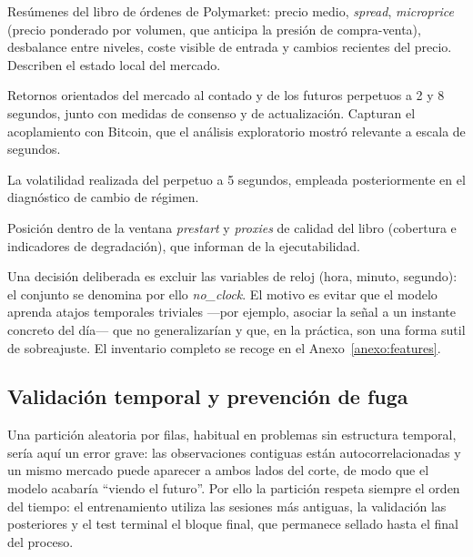 \begin{description}[noitemsep, leftmargin=2.8cm, font=\bfseries]
\item[Estado del libro] Resúmenes del libro de órdenes de Polymarket: precio medio,
\emph{spread}, \emph{microprice} (precio ponderado por volumen, que anticipa la presión de
compra-venta), desbalance entre niveles, coste visible de entrada y cambios recientes del
precio. Describen el estado local del mercado.
\item[Referencias externas] Retornos orientados del mercado al contado y de los futuros
perpetuos a 2 y 8 segundos, junto con medidas de consenso y de actualización. Capturan el
acoplamiento con Bitcoin, que el análisis exploratorio mostró relevante a escala de segundos.
\item[Volatilidad] La volatilidad realizada del perpetuo a 5 segundos, empleada posteriormente
en el diagnóstico de cambio de régimen.
\item[Contexto de ventana] Posición dentro de la ventana \emph{prestart} y \emph{proxies} de
calidad del libro (cobertura e indicadores de degradación), que informan de la ejecutabilidad.
\end{description}

Una decisión deliberada es excluir las variables de reloj (hora, minuto, segundo): el
conjunto se denomina por ello \emph{no\_clock}. El motivo es evitar que el modelo aprenda
atajos temporales triviales —por ejemplo, asociar la señal a un instante concreto del día—
que no generalizarían y que, en la práctica, son una forma sutil de sobreajuste. El inventario
completo se recoge en el Anexo~\ref{anexo:features}.

\subsection{Validación temporal y prevención de fuga}

Una partición aleatoria por filas, habitual en problemas sin estructura temporal, sería aquí
un error grave: las observaciones contiguas están autocorrelacionadas y un mismo mercado
puede aparecer a ambos lados del corte, de modo que el modelo acabaría ``viendo el futuro''.
Por ello la partición respeta siempre el orden del tiempo: el entrenamiento utiliza las
sesiones más antiguas, la validación las posteriores y el test terminal el bloque final, que
permanece sellado hasta el final del proceso.

